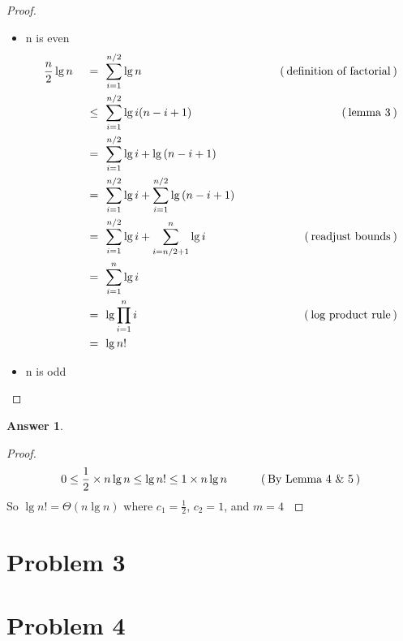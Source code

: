 \documentclass{article}
\theoremstyle{definition}
\newtheorem*{answer}{Answer}
\newcommand{\evidence}[1]{\ensuremath{\hspace{3em} (\hspace{0.2em} \text{#1} \hspace{0.2em})}}
\newcommand{\asymptotic}[3]{\ensuremath{#2 = #1(#3)}}
\newcommand{\bigTheta}[2]{\asymptotic{\Theta}{#1}{#2}}
\newcommand{\relation}[1]{\ensuremath{\hspace{0.2em} {{} #1 {}} \hspace{0.2em}}}
\newcommand{\equal}{\relation{=}}
\newcommand{\lesseq}{\relation{\le}}
\begin{document}
\begin{proof}
  \hfill
  \begin{itemize}
    \item n is even
      \begin{alignat*}{4}
        & \frac{n}{2}\lg{n} & \equal  & \sum_{i=1}^{n/2}{\lg{n}}            & \evidence{definition of factorial} \\
        & {}                & \lesseq & \sum_{i=1}^{n/2}{\lg{i(n - i + 1)}} & \evidence{lemma 3} \\
        & {}                & \equal  & \sum_{i=1}^{n/2}{\lg{i} + \lg{(n - i + 1)}} & {} \\
        & {}                & \equal  & \sum_{i=1}^{n/2}{\lg{i}} + \sum_{i=1}^{n/2}{\lg{(n - i + 1)}} & {} \\
        & {}                & \equal  & \sum_{i=1}^{n/2}{\lg{i}} + \sum_{i=n/2 + 1}^{n}{\lg{i}} & \evidence{readjust bounds} \\
        & {}                & \equal  & \sum_{i=1}^{n}{\lg{i}}   & {} \\
        & {}                & \equal  & \lg{\prod_{i=1}^{n}{i}}  & \evidence{log product rule} \\
        & {}                & \equal  & \lg{n!}                   & {}
      \end{alignat*}
    \item n is odd
  \end{itemize}
\end{proof}

\begin{answer}
  \hfill
  \begin{proof}
    \vspace{1em}
    \begin{equation*}
      0 \le \frac{1}{2} \times n \lg{n} \le \lg{n!} \le 1 \times n\lg{n} \evidence{By Lemma 4 $\&$ 5}
    \end{equation*}
    So $\bigTheta{\lg{n!}}{n\lg{n}}$ where $c_1 = \frac{1}{2}$, $c_2 = 1$, and $m = 4$ $\qedhere$ 
  \end{proof}
\end{answer}

\section*{Problem 3}

\section*{Problem 4}
\end{document}
